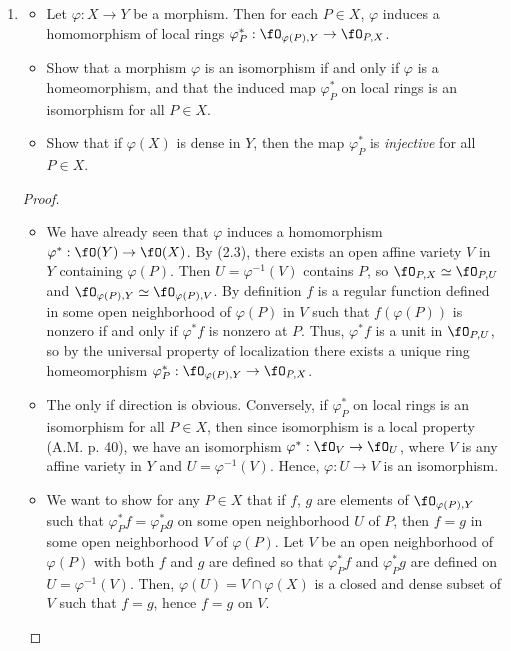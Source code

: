 \documentclass[a4paper]{article}
\begin{document}
\begin{enumerate} [label=\textbf{\arabic*.}, leftmargin=-0.05em]
\item[\textbf{3.}] \begin{itemize}
    \item[(a)] Let $\varphi : X \to Y$ be a morphism. Then for each $P \in X$, $\varphi$ induces a homomorphism of local rings $\varphi_P^* : \fO_{\varphi(P), Y} \to \fO_{P, X}$.
    \item[(b)] Show that a morphism $\varphi$ is an isomorphism if and only if $\varphi$ is a homeomorphism, and that the induced map $\varphi_P^*$ on local rings is an isomorphism for all $P \in X$.
    \item[(c)] Show that if $\varphi(X)$ is dense in $Y$, then the map $\varphi_P^*$ is \textit{injective} for all $P \in X$.
\end{itemize}

\begin{proof} $ $ \vspace{0pt}
    \begin{itemize} [leftmargin=0cm]
        \item[(a)] We have already seen that $\varphi$ induces a homomorphism $\varphi^* : \fO(Y) \to \fO(X)$.
        By (2.3), there exists an open affine variety $V$ in $Y$ containing $\varphi(P)$. Then $U = \varphi^{-1}(V)$ contains $P$, so $\fO_{P, X} \simeq \fO_{P, U}$ and $\fO_{\varphi(P), Y} \simeq \fO_{\varphi(P), V}$.
        By definition $f$ is a regular function defined in some open neighborhood of $\varphi(P)$ in $V$ such that $f(\varphi(P))$ is nonzero if and only if $\varphi^*f$ is nonzero at $P$.
        Thus, $\varphi^*f$ is a unit in $\fO_{P, U}$, so by the universal property of localization there exists a unique ring homeomorphism $\varphi_P^* : \fO_{\varphi(P),Y} \to \fO_{P, X}$.

        \item[(b)] The only if direction is obvious.
        Conversely, if $\varphi_P^*$ on local rings is an isomorphism for all $P \in X$, then since isomorphism is a local property (A.M. p. 40), we have an isomorphism $\varphi^* : \fO_V \to \fO_U$, where $V$ is any affine variety in $Y$ and $U = \varphi^{-1}(V)$.
        Hence, $\varphi : U \to V$ is an isomorphism.

        \item[(c)] We want to show for any $P \in X$ that if $f$, $g$ are elements of $\fO_{\varphi(P), Y}$ such that $\varphi_P^*f = \varphi_P^*g$ on some open neighborhood $U$ of $P$, then $f = g$ in some open neighborhood $V$ of $\varphi(P)$.
        Let $V$ be an open neighborhood of $\varphi(P)$ with both $f$ and $g$ are defined so that $\varphi_P^*f$ and $\varphi_P^*g$ are defined on $U = \varphi^{-1}(V)$.
        Then, $\varphi(U) = V \cap \varphi(X)$ is a closed and dense subset of $V$ such that $f = g$, hence $f = g$ on $V$.
    \end{itemize}
\end{proof}


\end{enumerate}
\end{document}

